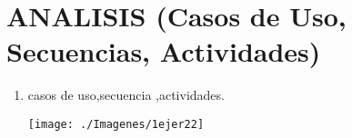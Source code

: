 \section{ANALISIS (Casos de Uso, Secuencias, Actividades)} 

\begin{enumerate}[1.]
	\item casos de uso,secuencia ,actividades.
    


	\begin{center}
	\texttt{[image: ./Imagenes/1ejer22]} 
	\end{center}

\end{enumerate} 